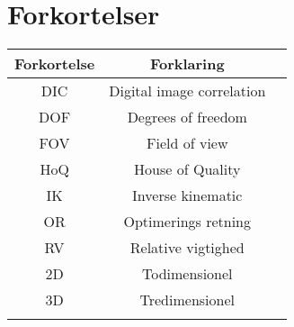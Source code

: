 \chapter*{Forkortelser}

\renewcommand{\arraystretch}{1.5} %
\begin{longtable}{c c c}
\textbf{Forkortelse}  & \textbf{Forklaring} \\
\hline
\endhead
    DIC & Digital image correlation  \\
    DOF & Degrees of freedom\\
    FOV & Field of view \\
    HoQ & House of Quality \\
    IK & Inverse kinematic\\
    OR & Optimerings retning \\
    RV & Relative vigtighed \\
    2D & Todimensionel\\
    3D & Tredimensionel\\
\label{tab:forkortelser}
\end{longtable}

